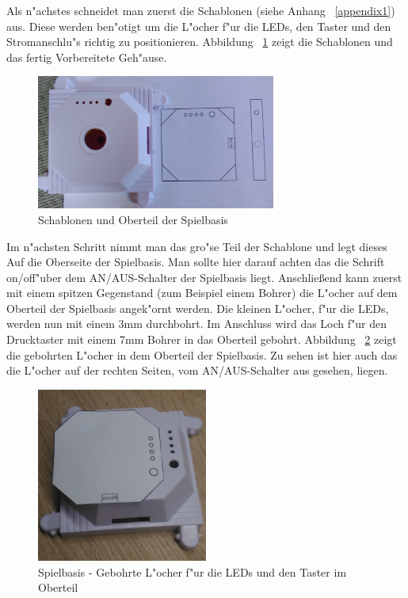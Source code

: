 
Als n"achstes schneidet man zuerst die Schablonen (siehe Anhang ~\ref{appendix1}) aus. Diese werden ben"otigt um die L"ocher f"ur die LEDs, den Taster und den Stromanschlu"s richtig zu positionieren.
Abbildung ~\ref{fig12} zeigt die Schablonen und das fertig Vorbereitete Geh"ause.

\vspace{1cm}
\begin{figure}[!ht]
	\centering
  	\includegraphics[width=0.7\textwidth]{pictures/loolou_012.jpg}
	\caption{Schablonen und Oberteil der Spielbasis}
	\label{fig12}
\end{figure}
\vspace{0.5cm}

Im n"achsten Schritt nimmt man das gro"se Teil der Schablone und legt dieses Auf die Oberseite der Spielbasis. Man sollte hier darauf achten das die Schrift \grqq on/off\grqq  "uber dem AN/AUS-Schalter der Spielbasis liegt. Anschließend kann zuerst mit einem spitzen Gegenstand (zum Beispiel einem Bohrer) die L"ocher auf dem Oberteil der Spielbasis angek"ornt werden.
Die kleinen L"ocher, f"ur die LEDs, werden nun mit einem 3mm durchbohrt. Im Anschluss wird das Loch f"ur den Drucktaster mit einem 7mm Bohrer in das Oberteil gebohrt. 
Abbildung ~\ref{fig13} zeigt die gebohrten L"ocher in dem Oberteil der Spielbasis. Zu sehen ist hier auch das die L"ocher auf der rechten Seiten, vom AN/AUS-Schalter aus gesehen, liegen.  

\vspace{1cm}
\begin{figure}[!ht]
  	\includegraphics[width=0.5\textwidth]{pictures/loolou_013.jpg}
	\centering
	\caption{Spielbasis - Gebohrte L"ocher f"ur die LEDs und den Taster im Oberteil}
	\label{fig13}
\end{figure}
\vspace{0.5cm}
\newpage

